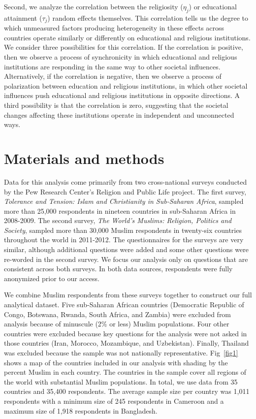 \documentclass[10pt,letterpaper]{article}
\begin{document}
Second, we analyze the correlation between the religiosity (\(\eta_j\))
or educational attainment (\(\tau_j\)) random effects themselves. This
correlation tells us the degree to which unmeasured factors producing
heterogeneity in these effects across countries operate similarly or
differently on educational and religious institutions. We consider three
possibilities for this correlation. If the correlation is positive, then
we observe a process of synchronicity in which educational and religious
institutions are responding in the same way to other societal
influences. Alternatively, if the correlation is negative, then we
observe a process of polarization between education and religious
institutions, in which other societal influences push educational and
religious institutions in opposite directions. A third possibility is
that the correlation is zero, suggesting that the societal changes
affecting these institutions operate in independent and unconnected
ways.

\section*{Materials and methods}

Data for this analysis come primarily from two cross-national surveys
conducted by the Pew Research Center's Religion and Public Life project.
The first survey, \emph{Tolerance and Tension: Islam and Christianity in
Sub-Saharan Africa}, sampled more than 25,000 respondents in nineteen
countries in sub-Saharan Africa in 2008-2009. The second survey,
\emph{The World's Muslims: Religion, Politics and Society}, sampled more
than 30,000 Muslim respondents in twenty-six countries throughout the
world in 2011-2012. The questionnaires for the surveys are very similar,
although additional questions were added and some other questions were
re-worded in the second survey. We focus our analysis only on questions
that are consistent across both surveys. In both data sources, respondents were 
fully anonymized prior to our access.

We combine Muslim respondents from these surveys together to construct
our full analytical dataset. Five sub-Saharan African countries
(Democratic Republic of Congo, Botswana, Rwanda, South Africa, and
Zambia) were excluded from analysis because of minuscule (2\% or less)
Muslim populations. Four other countries were excluded because key
questions for the analysis were not asked in those countries (Iran,
Morocco, Mozambique, and Uzbekistan). Finally, Thailand was excluded
because the sample was not nationally representative. Fig~\ref{fig1} shows a
map of the countries included in our analysis with shading by the
percent Muslim in each country. The countries in the sample cover all
regions of the world with substantial Muslim populations. In total, we
use data from 35 countries and 35,400 respondents. The average sample
size per country was 1,011 respondents with a minimum size of 245
respondents in Cameroon and a maximum size of 1,918 respondents in
Bangladesh.
\end{document}
